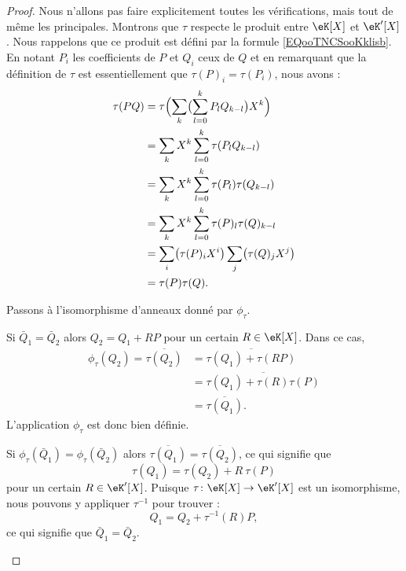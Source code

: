 \begin{proof}
	Nous n'allons pas faire explicitement toutes les vérifications, mais tout de même les principales. Montrons que \( \tau\) respecte le produit entre \( \eK[X]\) et \( \eK'[X]\). Nous rappelons que ce produit est défini par la formule \eqref{EQooTNCSooKklisb}. En notant \( P_i\) les coefficients de \( P\) et \( Q_i\) ceux de \( Q\) et en remarquant que la définition de \( \tau\) est essentiellement que \( \tau(P)_i=\tau(P_i)\), nous avons :
	\begin{subequations}
		\begin{align}
			\tau(PQ) & =\tau\Bigl( \sum_k\bigl(\sum_{l=0}^kP_lQ_{k-l}\bigr)X^k \Bigr)    \\
			         & =\sum_k X^k \sum_{l=0}^k\tau(P_lQ_{k-l})                          \\
			         & =\sum_k X^k \sum_{l=0}^k\tau(P_l)\tau(Q_{k-l})                    \\
			         & =\sum_k X^k \sum_{l=0}^k\tau(P)_l\tau(Q)_{k-l}                    \\
			         & =\sum_{i} \bigl(\tau(P)_iX^i\bigr)\sum_j\bigl(\tau(Q)_j X^j\bigr) \\
			         & =\tau(P)\tau(Q).
		\end{align}
	\end{subequations}

	Passons à l'isomorphisme d'anneaux donné par \( \phi_{\tau}\).
	\begin{subproof}

		Si \( \bar Q_1=\bar Q_2\) alors \( Q_2=Q_1+RP\) pour un certain \( R\in \eK[X]\). Dans ce cas,
		\begin{subequations}
			\begin{align}
				\phi_{\tau}(Q_2)=\overline{ \tau(Q_2) } & =\overline{ \tau(Q_1)+\tau(RP) }       \\
				                                        & =\overline{ \tau(Q_1)+\tau(R)\tau(P) } \\
				                                        & =\overline{ \tau(Q_1) }.
			\end{align}
		\end{subequations}
		L'application \( \phi_{\tau}\) est donc bien définie.

		\spitem[Injection]

		Si \( \phi_{\tau}(\bar Q_1)=\phi_{\tau}(\bar Q_2)\) alors \( \overline{ \tau(Q_1) }=\overline{ \tau(Q_2) }\), ce qui signifie que
		\begin{equation}
			\tau(Q_1)=\tau(Q_2)+R\ \tau(P)
		\end{equation}
		pour un certain \( R\in \eK'[X]\). Puisque \( \tau\colon \eK[X]\to \eK'[X]\) est un isomorphisme, nous pouvons y appliquer \( \tau^{-1}\) pour trouver :
		\begin{equation}
			Q_1=Q_2+\tau^{-1}(R)P,
		\end{equation}
		ce qui signifie que \( \bar Q_1=\bar Q_2\).


\end{subproof}
\end{proof}
